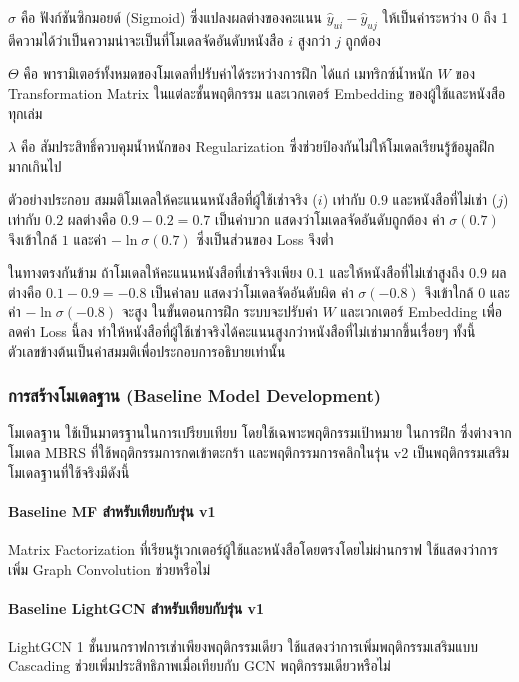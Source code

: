 $\sigma$ คือ ฟังก์ชันซิกมอยด์ (Sigmoid) ซึ่งแปลงผลต่างของคะแนน $\hat{y}_{ui} - \hat{y}_{uj}$ ให้เป็นค่าระหว่าง 0 ถึง 1 ตีความได้ว่าเป็นความน่าจะเป็นที่โมเดลจัดอันดับหนังสือ $i$ สูงกว่า $j$ ถูกต้อง

$\Theta$ คือ พารามิเตอร์ทั้งหมดของโมเดลที่ปรับค่าได้ระหว่างการฝึก ได้แก่ เมทริกซ์น้ำหนัก $W$ ของ Transformation Matrix ในแต่ละชั้นพฤติกรรม และเวกเตอร์ Embedding ของผู้ใช้และหนังสือทุกเล่ม

$\lambda$ คือ สัมประสิทธิ์ควบคุมน้ำหนักของ Regularization ซึ่งช่วยป้องกันไม่ให้โมเดลเรียนรู้ข้อมูลฝึกมากเกินไป 

\endgroup

ตัวอย่างประกอบ สมมติโมเดลให้คะแนนหนังสือที่ผู้ใช้เช่าจริง ($i$) เท่ากับ $0.9$ และหนังสือที่ไม่เช่า ($j$) เท่ากับ $0.2$ ผลต่างคือ $0.9 - 0.2 = 0.7$ เป็นค่าบวก แสดงว่าโมเดลจัดอันดับถูกต้อง ค่า $\sigma(0.7)$ จึงเข้าใกล้ $1$ และค่า $-\ln \sigma(0.7)$ ซึ่งเป็นส่วนของ Loss จึงต่ำ

ในทางตรงกันข้าม ถ้าโมเดลให้คะแนนหนังสือที่เช่าจริงเพียง $0.1$ และให้หนังสือที่ไม่เช่าสูงถึง $0.9$ ผลต่างคือ $0.1 - 0.9 = -0.8$ เป็นค่าลบ แสดงว่าโมเดลจัดอันดับผิด ค่า $\sigma(-0.8)$ จึงเข้าใกล้ $0$ และค่า $-\ln \sigma(-0.8)$ จะสูง ในขั้นตอนการฝึก ระบบจะปรับค่า $W$ และเวกเตอร์ Embedding เพื่อลดค่า Loss นี้ลง ทำให้หนังสือที่ผู้ใช้เช่าจริงได้คะแนนสูงกว่าหนังสือที่ไม่เช่ามากขึ้นเรื่อยๆ ทั้งนี้ ตัวเลขข้างต้นเป็นค่าสมมติเพื่อประกอบการอธิบายเท่านั้น

\subsubsection{การสร้างโมเดลฐาน (Baseline Model Development)}
โมเดลฐาน ใช้เป็นมาตรฐานในการเปรียบเทียบ โดยใช้เฉพาะพฤติกรรมเป้าหมาย ในการฝึก ซึ่งต่างจากโมเดล MBRS ที่ใช้พฤติกรรมการกดเข้าตะกร้า และพฤติกรรมการคลิกในรุ่น v2 เป็นพฤติกรรมเสริม โมเดลฐานที่ใช้จริงมีดังนี้

\paragraph{Baseline MF สำหรับเทียบกับรุ่น v1}
Matrix Factorization ที่เรียนรู้เวกเตอร์ผู้ใช้และหนังสือโดยตรงโดยไม่ผ่านกราฟ ใช้แสดงว่าการเพิ่ม Graph Convolution ช่วยหรือไม่

\paragraph{Baseline LightGCN สำหรับเทียบกับรุ่น v1}
LightGCN 1 ชั้นบนกราฟการเช่าเพียงพฤติกรรมเดียว ใช้แสดงว่าการเพิ่มพฤติกรรมเสริมแบบ Cascading ช่วยเพิ่มประสิทธิภาพเมื่อเทียบกับ GCN พฤติกรรมเดียวหรือไม่


